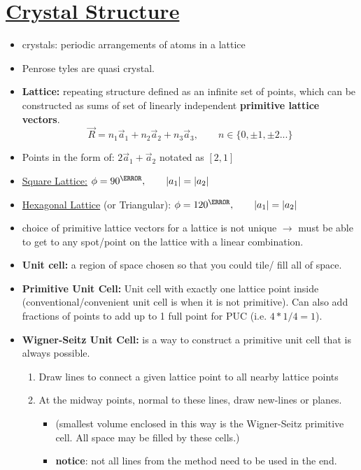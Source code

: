 \section[Crystal Structure]{\hyperlink{toc}{Crystal Structure}}


\begin{itemize}
    \item crystals: periodic arrangements of atoms in a lattice
    \item Penrose tyles are quasi crystal.
    \item \textbf{Lattice:} repeating structure defined as an infinite set of points, which can be constructed as sums of set of linearly independent \textbf{primitive lattice vectors}.
    \[ \vec{R} = n_1 \vec{a}_1 + n_2 \vec{a}_2 + n_3 \vec{a}_3, \qquad n \in \{0, \pm1, \pm2 ...\} \]
    \item Points in the form of: $2\vec{a}_1 + \vec{a}_2$ notated as $[2,1]$
    \item \underline{Square Lattice:} $\phi = 90^{\degree}, \qquad |a_1|=|a_2|$
    \item \underline{Hexagonal Lattice} (or Triangular): $\phi = 120^{\degree}, \qquad |a_1|=|a_2|$
    \item choice of primitive lattice vectors for a lattice is not unique $\rightarrow$ must be able to get to any spot/point on the lattice with a linear combination.
    \item \textbf{Unit cell:} a region of space chosen so that you could tile/ fill all of space.
    \item \textbf{Primitive Unit Cell:} Unit cell with exactly one lattice point inside (conventional/convenient unit cell is when it is not primitive). Can also add fractions of points to add up to 1 full point for PUC (i.e. $4 * 1/4 = 1$).
    \item \textbf{Wigner-Seitz Unit Cell:} is a way to construct a primitive unit cell that is always possible.
    \begin{enumerate}
        \item Draw lines to connect a given lattice point to all nearby lattice points
        \item At the midway points, normal to these lines, draw new-lines or planes.
        \begin{itemize}
            \item (smallest volume enclosed in this way is the Wigner-Seitz primitive cell. All space may be filled by these cells.)
            \item \textbf{notice}: not all lines from the method need to be used in the end.

\end{itemize}
\end{enumerate}
\end{itemize}
